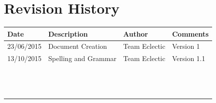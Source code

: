 \documentclass[11pt]{article}
\begin{document}


\setcounter{tocdepth}{3}
\setcounter{secnumdepth}{5}
\tableofcontents

\newpage
\section{Revision History}
\begin{table}[h]
\begin{tabular}{llll}
\textbf{Date}          & \textbf{Description}  & \textbf{Author}       & \textbf{Comments}   \\ \hline
\multicolumn{1}{|R{2cm}|}{23/06/2015} & \multicolumn{1}{L{4.5cm}|}{Document Creation} & \multicolumn{1}{l|}{Team Eclectic} & \multicolumn{1}{L{4cm}|}{Version 1} \\ \hline
\multicolumn{1}{|R{2cm}|}{13/10/2015} & \multicolumn{1}{L{4.5cm}|}{Spelling and Grammar} & \multicolumn{1}{l|}{Team Eclectic} & \multicolumn{1}{L{4cm}|}{Version 1.1} \\ \hline
\multicolumn{1}{|l|}{} & \multicolumn{1}{l|}{} & \multicolumn{1}{l|}{} & \multicolumn{1}{l|}{} \\ \hline
\multicolumn{1}{|l|}{} & \multicolumn{1}{l|}{} & \multicolumn{1}{l|}{} & \multicolumn{1}{l|}{} \\ \hline
\multicolumn{1}{|l|}{} & \multicolumn{1}{l|}{} & \multicolumn{1}{l|}{} & \multicolumn{1}{l|}{} \\ \hline
\multicolumn{1}{|l|}{} & \multicolumn{1}{l|}{} & \multicolumn{1}{l|}{} & \multicolumn{1}{l|}{} \\ \hline
\multicolumn{1}{|l|}{} & \multicolumn{1}{l|}{} & \multicolumn{1}{l|}{} & \multicolumn{1}{l|}{} \\ \hline
\multicolumn{1}{|l|}{} & \multicolumn{1}{l|}{} & \multicolumn{1}{l|}{} & \multicolumn{1}{l|}{} \\ \hline
\multicolumn{1}{|l|}{} & \multicolumn{1}{l|}{} & \multicolumn{1}{l|}{} & \multicolumn{1}{l|}{} \\ \hline
\multicolumn{1}{|l|}{} & \multicolumn{1}{l|}{} & \multicolumn{1}{l|}{} & \multicolumn{1}{l|}{} \\ \hline
\multicolumn{1}{|l|}{} & \multicolumn{1}{l|}{} & \multicolumn{1}{l|}{} & \multicolumn{1}{l|}{} \\ \hline
\multicolumn{1}{|l|}{} & \multicolumn{1}{l|}{} & \multicolumn{1}{l|}{} & \multicolumn{1}{l|}{} \\ \hline
\multicolumn{1}{|l|}{} & \multicolumn{1}{l|}{} & \multicolumn{1}{l|}{} & \multicolumn{1}{l|}{} \\ \hline
\multicolumn{1}{|l|}{} & \multicolumn{1}{l|}{} & \multicolumn{1}{l|}{} & \multicolumn{1}{l|}{} \\ \hline
\multicolumn{1}{|l|}{} & \multicolumn{1}{l|}{} & \multicolumn{1}{l|}{} & \multicolumn{1}{l|}{} \\ \hline
\end{tabular}
\end{table}
\end{document}
